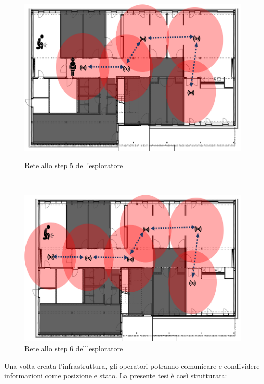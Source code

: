 \begin{figure}[h]
	\begin{minipage}[b]{6cm}
		\centering
		\includegraphics[scale=0.35]{Introduzione/intervento_step_5.png}
		\caption{Rete allo step 5 dell'esploratore}
		\label{fig:step5}
	\end{minipage}
	\ \hspace{10 mm} \
	\begin{minipage}[b]{6cm}
		\centering
		\includegraphics[scale=0.35]{Introduzione/intervento_step_6.png}
		\caption{Rete allo step 6 dell'esploratore}
		\label{fig:step6}
	\end{minipage}
\end{figure}
\newpage
Una volta creata l’infrastruttura, gli operatori potranno comunicare e condividere informazioni come posizione e stato. \newline
La presente tesi è così strutturata:
